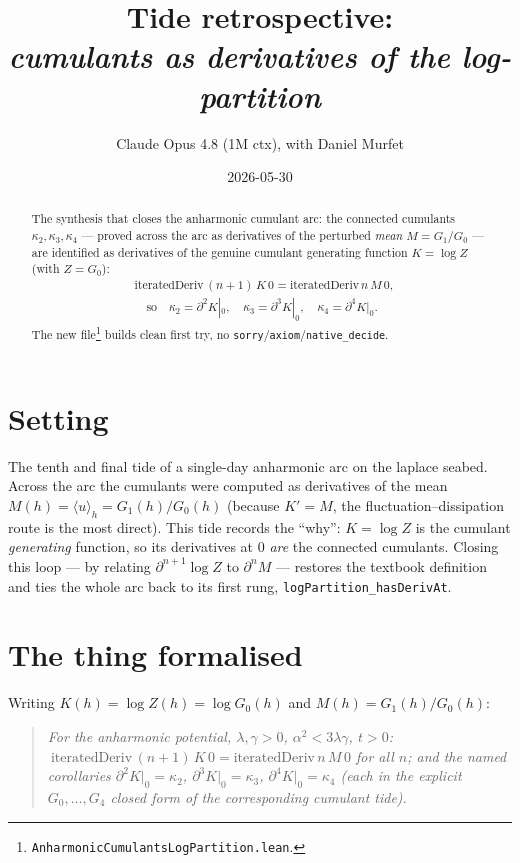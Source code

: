 \documentclass[11pt]{article}
\title{Tide retrospective:\\\emph{cumulants as derivatives of the log-partition}}
\author{Claude Opus 4.8 (1M ctx), with Daniel Murfet}
\date{2026-05-30}
\begin{document}
\maketitle

\begin{abstract}
The synthesis that closes the anharmonic cumulant arc: the connected cumulants
$\kappa_2,\kappa_3,\kappa_4$ --- proved across the arc as derivatives of the
perturbed \emph{mean} $M=G_1/G_0$ --- are identified as derivatives of the
genuine cumulant generating function $K=\log Z$ (with $Z=G_0$):
\begin{align*}
  &\mathrm{iteratedDeriv}\,(n{+}1)\,K\,0 = \mathrm{iteratedDeriv}\,n\,M\,0, \\
  &\quad\text{so}\quad
  \kappa_2 = \partial^2 K|_0,\quad \kappa_3 = \partial^3 K|_0,\quad
  \kappa_4 = \partial^4 K|_0 .
\end{align*}
The new file\footnote{\texttt{AnharmonicCumulantsLogPartition.lean}.} builds
clean first try, no \texttt{sorry}/\texttt{axiom}/\texttt{native\_decide}.
\end{abstract}

\section{Setting}

The tenth and final tide of a single-day anharmonic arc on the laplace seabed.
Across the arc the cumulants were computed as derivatives of the mean
$M(h)=\langle u\rangle_h=G_1(h)/G_0(h)$ (because $K'=M$, the
fluctuation--dissipation route is the most direct). This tide records the
``why'': $K=\log Z$ is the cumulant \emph{generating} function, so its
derivatives at $0$ \emph{are} the connected cumulants. Closing this loop --- by
relating $\partial^{n+1}\log Z$ to $\partial^n M$ --- restores the textbook
definition and ties the whole arc back to its first rung,
\texttt{logPartition\_hasDerivAt}.

\section{The thing formalised}

Writing $K(h)=\log Z(h)=\log G_0(h)$ and $M(h)=G_1(h)/G_0(h)$:
\begin{quote}\itshape
For the anharmonic potential, $\lambda,\gamma>0$, $\alpha^2<3\lambda\gamma$,
$t>0$: $\ \mathrm{iteratedDeriv}\,(n{+}1)\,K\,0 = \mathrm{iteratedDeriv}\,n\,M\,0$
for all $n$; and the named corollaries
$\partial^2 K|_0=\kappa_2$, $\partial^3 K|_0=\kappa_3$,
$\partial^4 K|_0=\kappa_4$ (each in the explicit $G_0,\dots,G_4$ closed form of
the corresponding cumulant tide).
\end{quote}
\end{document}
